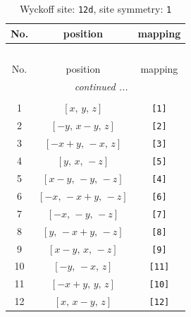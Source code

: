 \documentclass[fleqn,8pt]{jsarticle}
\begin{document}
\renewcommand{\arraystretch}{1.2}
\begin{longtable}{ccc}
\caption{Wyckoff site: {\tt 12d}, site symmetry: {\tt 1}}
 \\
 \hline \hline
No. & position & mapping \\ \hline \endfirsthead

\multicolumn{2}{l}{\tablename\ \thetable{}} \\
 \hline \hline
No. & position & mapping \\ \hline \endhead

 \hline \hline
\multicolumn{2}{r}{\footnotesize\it continued ...} \\ \endfoot

 \hline \hline
\multicolumn{2}{r}{} \\ \endlastfoot

1 & $\left[ x,\, y,\, z \right]$ & {\tt [1]} \\ \hline
2 & $\left[ - y,\, x - y,\, z \right]$ & {\tt [2]} \\ \hline
3 & $\left[ - x + y,\, - x,\, z \right]$ & {\tt [3]} \\ \hline
4 & $\left[ y,\, x,\, - z \right]$ & {\tt [5]} \\ \hline
5 & $\left[ x - y,\, - y,\, - z \right]$ & {\tt [4]} \\ \hline
6 & $\left[ - x,\, - x + y,\, - z \right]$ & {\tt [6]} \\ \hline
7 & $\left[ - x,\, - y,\, - z \right]$ & {\tt [7]} \\ \hline
8 & $\left[ y,\, - x + y,\, - z \right]$ & {\tt [8]} \\ \hline
9 & $\left[ x - y,\, x,\, - z \right]$ & {\tt [9]} \\ \hline
10 & $\left[ - y,\, - x,\, z \right]$ & {\tt [11]} \\ \hline
11 & $\left[ - x + y,\, y,\, z \right]$ & {\tt [10]} \\ \hline
12 & $\left[ x,\, x - y,\, z \right]$ & {\tt [12]} \\
\end{longtable}
\end{document}
